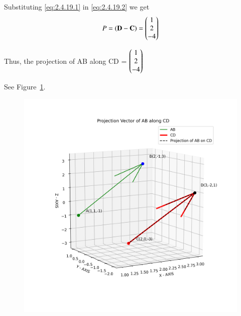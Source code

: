 \documentclass[journal]{IEEEtran}
\begin{document}
Substituting \eqref{eq:2.4.19.1} in \eqref{eq:2.4.19.2} we get
\begin{align}
    P = (\mathbf{D} - \mathbf{C}) =  \begin{pmatrix}1 \\ 2 \\-4\end{pmatrix}
\end{align}

 Thus, the projection of AB along CD = $\begin{pmatrix}1 \\ 2 \\-4\end{pmatrix}\\$

See Figure~\ref{fig:3DVectors}.

\begin{figure}[h!]
    \centering
    \includegraphics[width=1.0\linewidth]{figs/fig.png}
    \caption{}
    \label{fig:3DVectors}
\end{figure}
\end{document}
